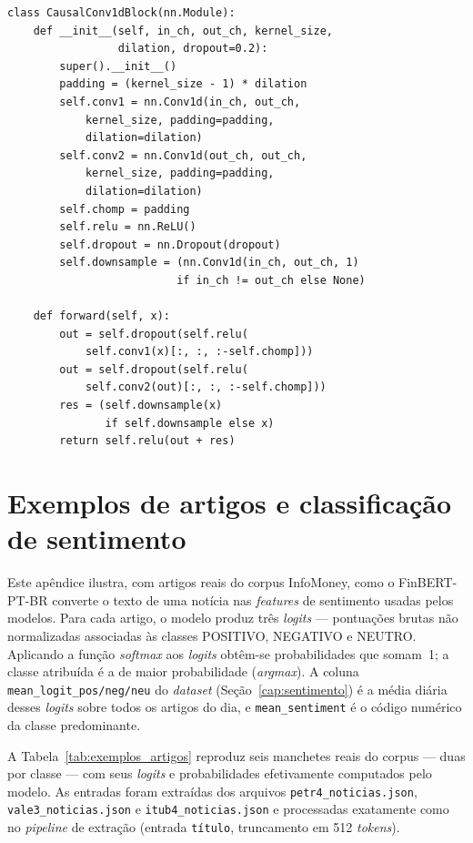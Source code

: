 \begin{lstlisting}[caption={Bloco convolucional causal da TCN.},label={lst:tcn}]
class CausalConv1dBlock(nn.Module):
    def __init__(self, in_ch, out_ch, kernel_size,
                 dilation, dropout=0.2):
        super().__init__()
        padding = (kernel_size - 1) * dilation
        self.conv1 = nn.Conv1d(in_ch, out_ch,
            kernel_size, padding=padding,
            dilation=dilation)
        self.conv2 = nn.Conv1d(out_ch, out_ch,
            kernel_size, padding=padding,
            dilation=dilation)
        self.chomp = padding
        self.relu = nn.ReLU()
        self.dropout = nn.Dropout(dropout)
        self.downsample = (nn.Conv1d(in_ch, out_ch, 1)
                          if in_ch != out_ch else None)

    def forward(self, x):
        out = self.dropout(self.relu(
            self.conv1(x)[:, :, :-self.chomp]))
        out = self.dropout(self.relu(
            self.conv2(out)[:, :, :-self.chomp]))
        res = (self.downsample(x)
               if self.downsample else x)
        return self.relu(out + res)
\end{lstlisting}

\chapter{Exemplos de artigos e classificação de sentimento}\label{ap:artigos}

Este apêndice ilustra, com artigos reais do corpus InfoMoney, como o FinBERT-PT-BR \cite{souza2023} converte o texto de uma notícia nas \textit{features} de sentimento usadas pelos modelos. Para cada artigo, o modelo produz três \textit{logits} --- pontuações brutas não normalizadas associadas às classes POSITIVO, NEGATIVO e NEUTRO. Aplicando a função \textit{softmax} aos \textit{logits} obtêm-se probabilidades que somam~1; a classe atribuída é a de maior probabilidade (\textit{argmax}). A coluna \texttt{mean\_logit\_pos/neg/neu} do \textit{dataset} (Seção~\ref{cap:sentimento}) é a média diária desses \textit{logits} sobre todos os artigos do dia, e \texttt{mean\_sentiment} é o código numérico da classe predominante.

A Tabela~\ref{tab:exemplos_artigos} reproduz seis manchetes reais do corpus --- duas por classe --- com seus \textit{logits} e probabilidades efetivamente computados pelo modelo. As entradas foram extraídas dos arquivos \texttt{petr4\_noticias.json}, \texttt{vale3\_noticias.json} e \texttt{itub4\_noticias.json} e processadas exatamente como no \textit{pipeline} de extração (entrada \texttt{título}, truncamento em 512 \textit{tokens}).

